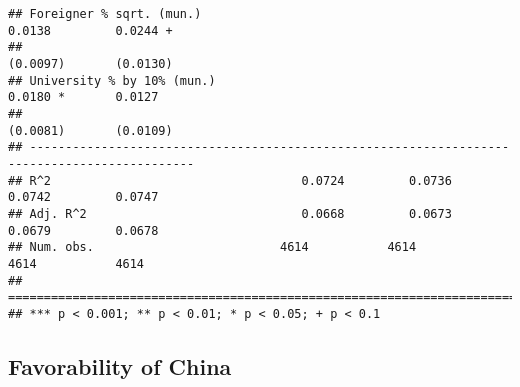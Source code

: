 \documentclass[
]{article}
\begin{document}
\begin{verbatim}
## Foreigner % sqrt. (mun.)                                            0.0138         0.0244 +  
##                                                                    (0.0097)       (0.0130)   
## University % by 10% (mun.)                                          0.0180 *       0.0127    
##                                                                    (0.0081)       (0.0109)   
## ---------------------------------------------------------------------------------------------
## R^2                                   0.0724         0.0736         0.0742         0.0747    
## Adj. R^2                              0.0668         0.0673         0.0679         0.0678    
## Num. obs.                          4614           4614           4614           4614         
## =============================================================================================
## *** p < 0.001; ** p < 0.01; * p < 0.05; + p < 0.1
\end{verbatim}

\hypertarget{favorability-of-china-1}{%
\subsection{Favorability of China}\label{favorability-of-china-1}}
\end{document}
